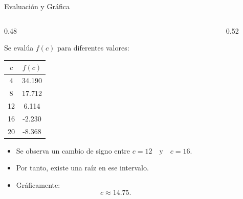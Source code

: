 \documentclass[../../main.tex]{subfiles}
\begin{document}
\begin{frame}{Evaluación y Gráfica}

\begin{columns}

\begin{column}{0.48\textwidth}

Se evalúa \(f(c)\) para diferentes valores:

\begin{center}
\begin{tabular}{|c|c|}
\hline
\(c\) & \(f(c)\) \\
\hline
4  & 34.190 \\
8  & 17.712 \\
12 & 6.114 \\
16 & -2.230 \\
20 & -8.368 \\
\hline
\end{tabular}
\end{center}

\begin{itemize}
    \item Se observa un cambio de signo entre
    \(
    c=12
    \quad\text{y}\quad
    c=16.
    \)
    \item Por tanto, existe una raíz en ese intervalo.
    \item Gráficamente:
    \[
    c\approx14.75.
    \]
\end{itemize}

\end{column}


\begin{column}{0.52\textwidth}

\centering


\end{column}

\end{columns}

\end{frame}
\end{document}
